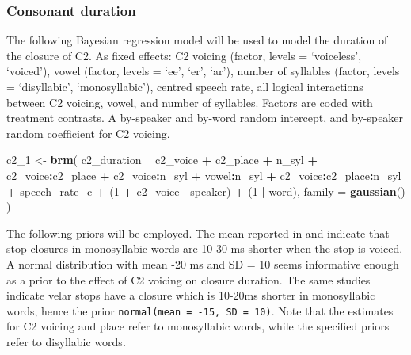 \documentclass[11pt,]{article}
\newenvironment{Shaded}{\begin{snugshade}}{\end{snugshade}}
\newcommand{\DataTypeTok}[1]{\textcolor[rgb]{0.13,0.29,0.53}{#1}}
\newcommand{\DecValTok}[1]{\textcolor[rgb]{0.00,0.00,0.81}{#1}}
\newcommand{\KeywordTok}[1]{\textcolor[rgb]{0.13,0.29,0.53}{\textbf{#1}}}
\newcommand{\NormalTok}[1]{#1}
\newcommand{\OperatorTok}[1]{\textcolor[rgb]{0.81,0.36,0.00}{\textbf{#1}}}
\newcommand{\StringTok}[1]{\textcolor[rgb]{0.31,0.60,0.02}{#1}}
\begin{document}
\hypertarget{consonant-duration}{%
\subsubsection{Consonant duration}\label{consonant-duration}}

The following Bayesian regression model will be used to model the
duration of the closure of C2. As fixed effects: C2 voicing (factor,
levels = `voiceless', `voiced'), vowel (factor, levels = `ee', `er',
`ar'), number of syllables (factor, levels = `disyllabic',
`monosyllabic'), centred speech rate, all logical interactions between
C2 voicing, vowel, and number of syllables. Factors are coded with
treatment contrasts. A by-speaker and by-word random intercept, and
by-speaker random coefficient for C2 voicing.

\begin{Shaded}
\begin{Highlighting}[]
\NormalTok{c2_}\DecValTok{1}\NormalTok{ <-}\StringTok{ }\KeywordTok{brm}\NormalTok{(}
\NormalTok{  c2_duration }\OperatorTok{~}
\StringTok{    }\NormalTok{c2_voice }\OperatorTok{+}
\StringTok{    }\NormalTok{c2_place }\OperatorTok{+}
\StringTok{    }\NormalTok{n_syl }\OperatorTok{+}
\StringTok{    }\NormalTok{c2_voice}\OperatorTok{:}\NormalTok{c2_place }\OperatorTok{+}
\StringTok{    }\NormalTok{c2_voice}\OperatorTok{:}\NormalTok{n_syl }\OperatorTok{+}
\StringTok{    }\NormalTok{vowel}\OperatorTok{:}\NormalTok{n_syl }\OperatorTok{+}
\StringTok{    }\NormalTok{c2_voice}\OperatorTok{:}\NormalTok{c2_place}\OperatorTok{:}\NormalTok{n_syl }\OperatorTok{+}
\StringTok{    }\NormalTok{speech_rate_c }\OperatorTok{+}
\StringTok{    }\NormalTok{(}\DecValTok{1} \OperatorTok{+}\StringTok{ }\NormalTok{c2_voice }\OperatorTok{|}\StringTok{ }\NormalTok{speaker) }\OperatorTok{+}
\StringTok{    }\NormalTok{(}\DecValTok{1} \OperatorTok{|}\StringTok{ }\NormalTok{word),}
  \DataTypeTok{family =} \KeywordTok{gaussian}\NormalTok{()}
\NormalTok{)}
\end{Highlighting}
\end{Shaded}

The following priors will be employed. The mean reported in
\citet{sharf1962} and \citet{luce1985} indicate that stop closures in
monosyllabic words are 10-30 ms shorter when the stop is voiced. A
normal distribution with mean -20 ms and SD = 10 seems informative
enough as a prior to the effect of C2 voicing on closure duration. The
same studies indicate velar stops have a closure which is 10-20ms
shorter in monosyllabic words, hence the prior
\texttt{normal(mean\ =\ -15,\ SD\ =\ 10)}. Note that the estimates for
C2 voicing and place refer to monosyllabic words, while the specified
priors refer to disyllabic words.
\end{document}
